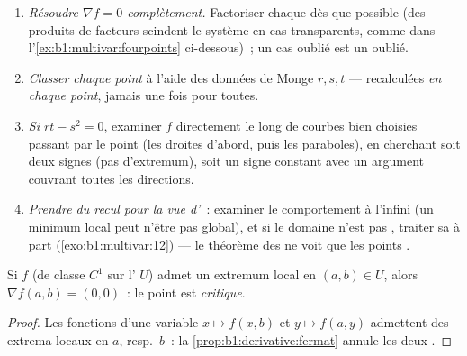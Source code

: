 \begin{method}
\label{met:b1:multivar:extremamethod}
\begin{enumerate}
  \item \emph{Résoudre $\nabla f = 0$ complètement.} Factoriser
        chaque  dès que possible (des produits
        de facteurs  scindent le système en cas
        transparents, comme dans
        l'\cref{ex:b1:multivar:fourpoints} ci-dessous)~; un cas
        oublié est un  oublié.
  \item \emph{Classer chaque point} à l'aide des données de
        Monge $r, s, t$ --- recalculées \emph{en chaque point},
        jamais une fois pour toutes.
  \item \emph{Si $rt - s^2 = 0$}, examiner $f$ directement le
        long de courbes bien choisies passant par le point (les
        droites d'abord, puis les paraboles), en cherchant soit
        deux signes (pas d'extremum), soit un signe constant avec
        un argument couvrant toutes les directions.
  \item \emph{Prendre du recul pour la vue d'}~:
        examiner le comportement à l'infini (un minimum local
        peut n'être pas global), et si le domaine n'est pas
        , traiter sa  à part
        (\cref{exo:b1:multivar:12}) --- le théorème des  ne voit que les points .
\end{enumerate}
\end{method}

\begin{theorem}\label{thm:b1:multivar:critical}
Si $f$ (de classe $C^1$ sur l' $U$) admet un extremum local
en $(a,b) \in U$, alors $\nabla f(a,b) = (0,0)$~: le point est
\emph{critique}.
\end{theorem}

\begin{proof}
Les fonctions d'une variable $x \mapsto f(x, b)$ et $y \mapsto f(a,
y)$ admettent des extrema locaux  en $a$, resp.\ $b$~:
la \cref{prop:b1:derivative:fermat} annule les deux .
\end{proof}

